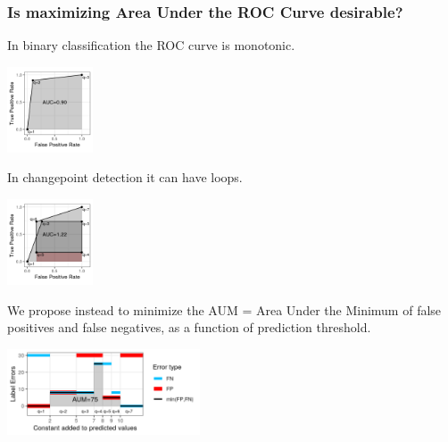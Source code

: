 \documentclass{beamer}
\begin{document}
\begin{frame}
  \frametitle{Is maximizing Area Under the ROC Curve desirable?}
  
  \parbox{2in}{In binary classification the ROC curve is monotonic.} \parbox{2in}{
  \includegraphics[height=1in]{figure-more-than-one-less-auc} 
}

\parbox{2in}{In changepoint detection it can have loops.} \parbox{2in}{
  \includegraphics[height=1in]{figure-more-than-one-more-auc}
}

  \parbox{2in}{We propose instead to minimize the AUM = Area Under
    the Minimum of false positives and false negatives, as a function of prediction threshold.} \parbox{2in}{
  \includegraphics[height=1in]{figure-more-than-one-more-aum}
}



\end{frame}
\end{document}
